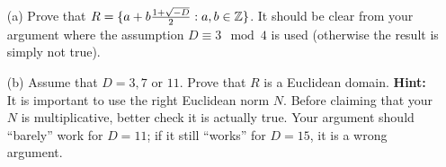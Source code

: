\documentclass[12pt]{amsart}
\begin{document}
\begin{itemize}
\item[(a)] Prove that $R=\{a+ b \frac{1+\sqrt{-D}}{2} : a,b\in{\mathbb Z} \}$. It should be clear from your argument where the assumption $D\equiv 3\mod 4$ is used (otherwise the result is simply not true).

\item[(b)] Assume that $D=3, 7$ or $11$. Prove that $R$ is a Euclidean domain. {\bf Hint:} It is important to use the right Euclidean norm $N$. Before claiming that your $N$ is multiplicative, better check it is actually true. Your argument should ``barely'' work for
$D=11$; if it still ``works'' for $D=15$, it is a wrong argument.
\end{itemize} 
\end{document}
